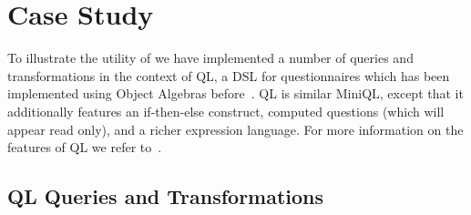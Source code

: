 \section{Case Study}\label{sec:case_study}

To illustrate the utility of \name we have implemented a number of queries and transformations in the context of QL, a DSL for questionnaires which has been implemented using Object Algebras before~\cite{gouseti14extensible}.
QL is similar MiniQL, except that it additionally features an if-then-else construct, computed questions (which will appear read only), and a richer expression language.
For more information on the features of QL we refer to~\cite{erdweg2013state}.




\subsection{QL Queries and Transformations}

